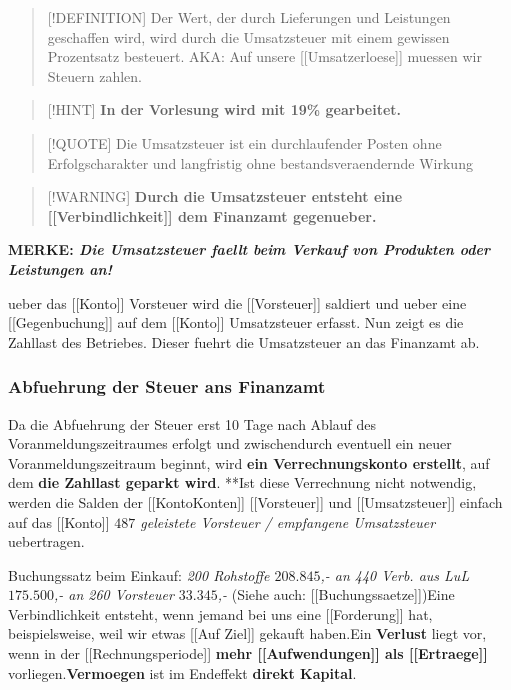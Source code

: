 \begin{quote}
{[}!DEFINITION{]} Der Wert, der durch Lieferungen und Leistungen
geschaffen wird, wird durch die Umsatzsteuer mit einem gewissen
Prozentsatz besteuert. AKA: Auf unsere {[}{[}Umsatzerloese{]}{]} muessen
wir Steuern zahlen.
\end{quote}

\begin{quote}
{[}!HINT{]} \textbf{In der Vorlesung wird mit 19\% gearbeitet.}
\end{quote}

\begin{quote}
{[}!QUOTE{]} Die Umsatzsteuer ist ein durchlaufender Posten ohne
Erfolgscharakter und langfristig ohne bestandsveraendernde Wirkung
\end{quote}

\begin{quote}
{[}!WARNING{]} \textbf{Durch die Umsatzsteuer entsteht eine
{[}{[}Verbindlichkeit{]}{]} dem Finanzamt gegenueber.}
\end{quote}

\textbf{MERKE: \emph{Die Umsatzsteuer faellt beim Verkauf von Produkten
oder Leistungen an!}}

ueber das {[}{[}Konto{]}{]} Vorsteuer wird die {[}{[}Vorsteuer{]}{]}
saldiert und ueber eine {[}{[}Gegenbuchung{]}{]} auf dem
{[}{[}Konto{]}{]} Umsatzsteuer erfasst. Nun zeigt es die Zahllast des
Betriebes. Dieser fuehrt die Umsatzsteuer an das Finanzamt ab.

\subsubsection{Abfuehrung der Steuer ans
Finanzamt}\label{abfuxfchrung-der-steuer-ans-finanzamt}

Da die Abfuehrung der Steuer erst 10 Tage nach Ablauf des
Voranmeldungszeitraumes erfolgt und zwischendurch eventuell ein neuer
Voranmeldungszeitraum beginnt, wird \textbf{ein Verrechnungskonto
erstellt}, auf dem \textbf{die Zahllast geparkt wird}. **Ist diese
Verrechnung nicht notwendig, werden die Salden der
{[}{[}Konto\textbar Konten{]}{]} {[}{[}Vorsteuer{]}{]} und
{[}{[}Umsatzsteuer{]}{]} einfach auf das {[}{[}Konto{]}{]} \emph{\(487\)
geleistete Vorsteuer / empfangene Umsatzsteuer} uebertragen.

Buchungssatz beim Einkauf: \emph{200 Rohstoffe \(208.845\),- an 440
Verb. aus LuL \(175.500\),- an 260 Vorsteuer \(33.345\),-} (Siehe auch:
{[}{[}Buchungssaetze{]}{]})Eine Verbindlichkeit entsteht, wenn jemand bei
uns eine {[}{[}Forderung{]}{]} hat, beispielsweise, weil wir etwas
{[}{[}Auf Ziel{]}{]} gekauft haben.Ein \textbf{Verlust} liegt vor, wenn
in der {[}{[}Rechnungsperiode{]}{]} \textbf{mehr
{[}{[}Aufwendungen{]}{]} als {[}{[}Ertraege{]}{]}}
vorliegen.\textbf{Vermoegen} ist im Endeffekt \textbf{direkt Kapital}.

